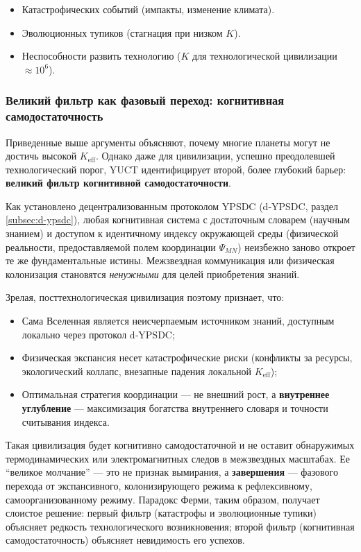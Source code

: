\documentclass[12pt,a4paper]{article}
\theoremstyle{remark}
\begin{document}
	\begin{itemize}
		\item Катастрофических событий (импакты, изменение климата).
		\item Эволюционных тупиков (стагнация при низком $K$).
		\item Неспособности развить технологию ($K$ для технологической цивилизации $\approx 10^6$).
	\end{itemize}
	
	\subsubsection*{Великий фильтр как фазовый переход: когнитивная самодостаточность}
	
	Приведенные выше аргументы объясняют, почему многие планеты могут не достичь высокой $K_{\mathrm{eff}}$. Однако даже для цивилизации, успешно преодолевшей технологический порог, YUCT идентифицирует второй, более глубокий барьер: \textbf{великий фильтр когнитивной самодостаточности}.
	
	Как установлено децентрализованным протоколом YPSDC (d‑YPSDC, раздел \ref{subsec:d-ypsdc}), любая когнитивная система с достаточным словарем (научным знанием) и доступом к идентичному индексу окружающей среды (физической реальности, предоставляемой полем координации $\Psi_{MN}$) неизбежно заново откроет те же фундаментальные истины. Межзвездная коммуникация или физическая колонизация становятся \emph{ненужными} для целей приобретения знаний.
	
	Зрелая, посттехнологическая цивилизация поэтому признает, что:
	\begin{itemize}[leftmargin=*]
		\item Сама Вселенная является неисчерпаемым источником знаний, доступным локально через протокол d‑YPSDC;
		\item Физическая экспансия несет катастрофические риски (конфликты за ресурсы, экологический коллапс, внезапные падения локальной $K_{\mathrm{eff}}$);
		\item Оптимальная стратегия координации — не внешний рост, а \textbf{внутреннее углубление} — максимизация богатства внутреннего словаря и точности считывания индекса.
	\end{itemize}
	
	Такая цивилизация будет когнитивно самодостаточной и не оставит обнаружимых термодинамических или электромагнитных следов в межзвездных масштабах. Ее ``великое молчание'' — это не признак вымирания, а \textbf{завершения} — фазового перехода от экспансивного, колонизирующего режима к рефлексивному, самоорганизованному режиму. Парадокс Ферми, таким образом, получает слоистое решение: первый фильтр (катастрофы и эволюционные тупики) объясняет редкость технологического возникновения; второй фильтр (когнитивная самодостаточность) объясняет невидимость его успехов.
	
\end{document}

